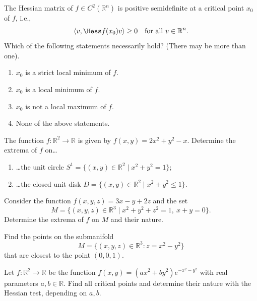 \begin{exercise}
\label{ex:6.8}
The Hessian matrix of $f \in C^2(\mathbb{R}^n)$ is positive semidefinite at a critical point $x_0$
of $f$, i.e.,
\[\langle v, \Hess f(x_0) v\rangle \geq 0 \quad \text{for all } v \in \mathbb{R}^n.\]
Which of the following statements necessarily hold? (There may be more than one).
\begin{enumerate}[label=\textbf{(\alph*)}]
  \item $x_0$ is a strict local minimum of $f$.
  \item $x_0$ is a local minimum of $f$.
  \item $x_0$ is not a local maximum of $f$.
  \item None of the above statements.
\end{enumerate}
\end{exercise}

\begin{exercise}
\label{ex:6.9}
The function $f : \mathbb{R}^2 \to \mathbb{R}$ is given by $f(x,y) = 2x^2+y^2-x$. Determine the
extrema of $f$ on\dots
\begin{enumerate}[label=\textbf{(\alph*)}]
  \item \dots the unit circle $S^1 = \{(x,y) \in \mathbb{R}^2 \mid x^2+y^2 = 1\}$;
  \item \dots the closed unit disk $D = \{(x,y) \in \mathbb{R}^2 \mid x^2+y^2 \leq 1\}$.
\end{enumerate}
\end{exercise}

\begin{exercise}
\label{ex:6.10}
Consider the function $f(x,y,z) = 3x-y+2z$ and the set
\[M = \{(x,y,z) \in \mathbb{R}^3 \mid x^2+y^2+z^2 = 1,\ x+y = 0\}.\]
Determine the extrema of $f$ on $M$ and their nature.
\end{exercise}

\begin{exercise}
\label{ex:6.11}
Find the points on the submanifold
\[M = \{(x,y,z) \in \mathbb{R}^3 : z = x^2-y^2\}\]
that are closest to the point $(0,0,1)$.
\end{exercise}

\begin{exercise}
\label{ex:6.12}
Let $f : \mathbb{R}^2 \to \mathbb{R}$ be the function $f(x,y) = (ax^2+by^2)e^{-x^2-y^2}$ with real
parameters $a, b \in \mathbb{R}$. Find all critical points and determine their nature with the
Hessian test, depending on $a, b$.
\end{exercise}

